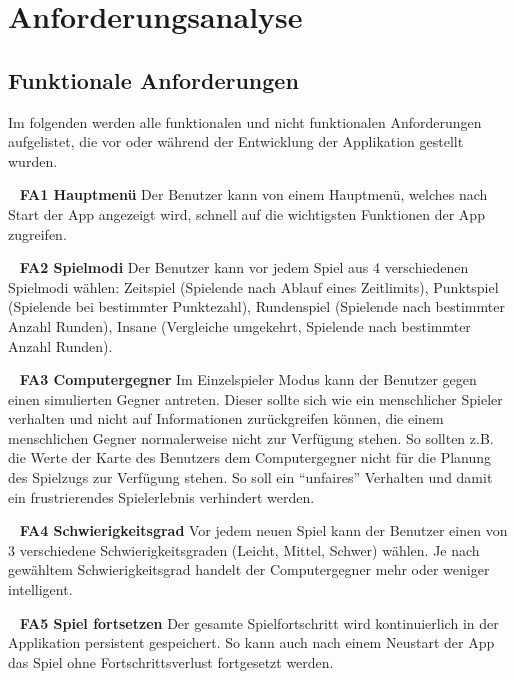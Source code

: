\documentclass{scrartcl}
\begin{document}
\section{Anforderungsanalyse}
\subsection{Funktionale Anforderungen}

Im folgenden werden alle funktionalen und nicht funktionalen Anforderungen
aufgelistet, die vor oder während der Entwicklung der Applikation gestellt
wurden.

\ \newline
\textbf{FA1 Hauptmenü} \newline
Der Benutzer kann von einem Hauptmenü, welches nach Start der App angezeigt
wird, schnell auf die wichtigsten Funktionen der App zugreifen.

\ \newline
\textbf{FA2 Spielmodi} \newline
Der Benutzer kann vor jedem Spiel aus 4 verschiedenen Spielmodi wählen:
Zeitspiel (Spielende nach Ablauf eines Zeitlimits), Punktspiel (Spielende bei
bestimmter Punktezahl), Rundenspiel (Spielende nach bestimmter Anzahl Runden),
Insane (Vergleiche umgekehrt, Spielende nach bestimmter Anzahl Runden).

\ \newline
\textbf{FA3 Computergegner} \newline
Im Einzelspieler Modus kann der Benutzer gegen einen simulierten Gegner
antreten. Dieser sollte sich wie ein menschlicher Spieler verhalten und nicht
auf Informationen zurückgreifen können, die einem menschlichen Gegner
normalerweise nicht zur Verfügung stehen. So sollten z.B. die Werte der Karte
des Benutzers dem Computergegner nicht für die Planung des Spielzugs zur
Verfügung stehen. So soll ein \enquote{unfaires} Verhalten und damit ein
frustrierendes Spielerlebnis verhindert werden.

\ \newline
\textbf{FA4 Schwierigkeitsgrad} \newline
Vor jedem neuen Spiel kann der Benutzer einen von 3 verschiedene
Schwierigkeitsgraden (Leicht, Mittel, Schwer) wählen. Je nach gewähltem
Schwierigkeitsgrad handelt der Computergegner mehr oder weniger intelligent.

\ \newline
\textbf{FA5 Spiel fortsetzen} \newline
Der gesamte Spielfortschritt wird kontinuierlich in der Applikation persistent
gespeichert. So kann auch nach einem Neustart der App das Spiel ohne
Fortschrittsverlust fortgesetzt werden.
\end{document}
